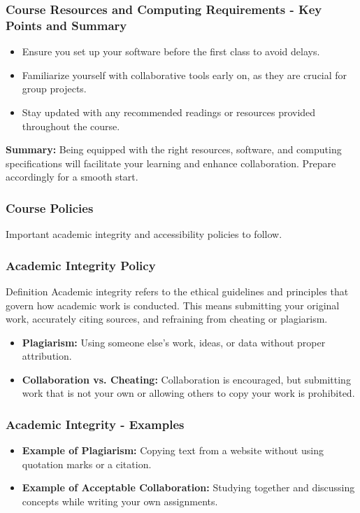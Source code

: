 \documentclass[aspectratio=169]{beamer}
\begin{document}
\begin{frame}[fragile]
    \frametitle{Course Resources and Computing Requirements - Key Points and Summary}
    \begin{itemize}
        \item Ensure you set up your software before the first class to avoid delays.
        \item Familiarize yourself with collaborative tools early on, as they are crucial for group projects.
        \item Stay updated with any recommended readings or resources provided throughout the course.
    \end{itemize}

    \textbf{Summary:} Being equipped with the right resources, software, and computing specifications will facilitate your learning and enhance collaboration. Prepare accordingly for a smooth start.
\end{frame}

\begin{frame}[fragile]
    \frametitle{Course Policies}
    Important academic integrity and accessibility policies to follow.
\end{frame}

\begin{frame}[fragile]
    \frametitle{Academic Integrity Policy}
    \begin{block}{Definition}
        Academic integrity refers to the ethical guidelines and principles that govern how academic work is conducted. This means submitting your original work, accurately citing sources, and refraining from cheating or plagiarism.
    \end{block}
    \begin{itemize}
        \item \textbf{Plagiarism:} Using someone else's work, ideas, or data without proper attribution.
        \item \textbf{Collaboration vs. Cheating:} Collaboration is encouraged, but submitting work that is not your own or allowing others to copy your work is prohibited.
    \end{itemize}
\end{frame}

\begin{frame}[fragile]
    \frametitle{Academic Integrity - Examples}
    \begin{itemize}
        \item \textbf{Example of Plagiarism:} Copying text from a website without using quotation marks or a citation.
        \item \textbf{Example of Acceptable Collaboration:} Studying together and discussing concepts while writing your own assignments.
    \end{itemize}
\end{frame}
\end{document}
